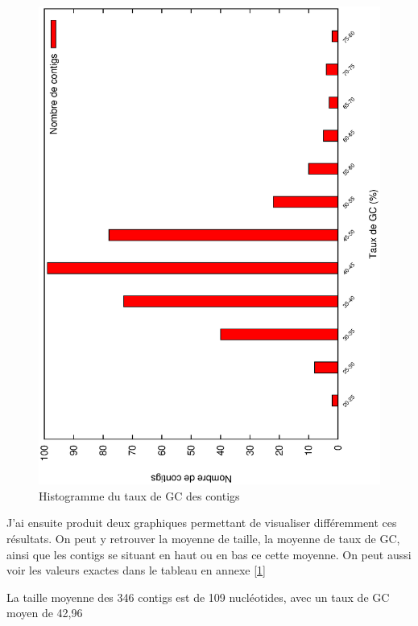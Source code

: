 \documentclass[10.9pt]{article} %
\begin{document}
\begin{figure}[p]
\includegraphics[scale=0.6,angle=270]{histogramme_taux.eps}
\caption{Histogramme du taux de GC des contigs}
\end{figure}

J'ai ensuite produit deux graphiques permettant de visualiser différemment ces résultats. On peut
y retrouver la moyenne de taille, la moyenne de taux de GC, ainsi que les contigs se situant en
haut ou en bas ce cette moyenne. On peut aussi voir les valeurs exactes dans le tableau en annexe \ref{1}

La taille moyenne des 346 contigs est de 109 nucléotides, avec un taux de GC moyen de 42,96%
\end{document}
